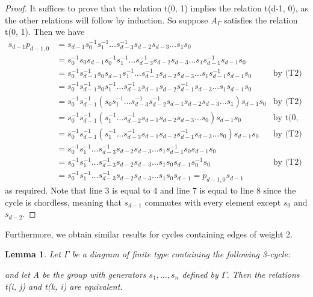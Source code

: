\documentclass[11pt]{amsart}
\newtheorem{lem}[thm]{Lemma}
\theoremstyle{definition}
\begin{document}
\begin{proof}
It suffices to prove that the relation t(0, 1) implies the relation t(d-1, 0), as the other relations will follow by induction. So suppose $A_{\Gamma}$ satisfies the relation t(0, 1). Then we have
\begin{align*}
s_{d-1}p_{d-1, 0} & = s_{d-1}s_{0}^{-1}s_{1}^{-1}\dots s_{d-3}^{-1}s_{d-2}s_{d-3}\dots s_1s_0 \\
&= s_{0}^{-1}s_{0}s_{d-1}s_{0}^{-1}s_{1}^{-1}\dots s_{d-3}^{-1}s_{d-2}s_{d-3}\dots s_{1}s_{d-1}^{-1}s_{d-1}s_{0} \\
&= s_{0}^{-1}s_{d-1}^{-1}s_{0}s_{d-1}s_{1}^{-1}\dots s_{d-3}^{-1}s_{d-2}s_{d-3}\dots s_{1}s_{d-1}^{-1}s_{d-1}s_{0} &\text{by (T2)} \\
&= s_{0}^{-1}s_{d-1}^{-1}s_{0}s_{1}^{-1}\dots s_{d-3}^{-1}s_{d-1}s_{d-2}s_{d-1}^{-1}s_{d-3}\dots s_{1}s_{d-1}s_{0} \\
&= s_{0}^{-1}s_{d-1}^{-1}(s_{0}s_{1}^{-1}\dots s_{d-3}^{-1}s_{d-2}^{-1}s_{d-1}s_{d-2}s_{d-3}\dots s_{1})s_{d-1}s_{0} &\text{by (T2)}\\
&= s_{0}^{-1}s_{d-1}^{-1}(s_{1}^{-1} \dots s_{d-2}^{-1}s_{d-1}s_{d-2}s_{d-3}\dots s_{0})s_{d-1}s_{0} &\text{by t(0, 1)}\\
&= s_{0}^{-1}s_{d-1}^{-1}(s_{1}^{-1} \dots s_{d-3}^{-1}s_{d-1}s_{d-2}s_{d-1}^{-1}s_{d-3}\dots s_{0})s_{d-1}s_{0} &\text{by (T2)}\\
&= s_{0}^{-1}s_{1}^{-1}\dots s_{d-3}^{-1}s_{d-2}s_{d-3}\dots s_{1}s_{d-1}^{-1}s_{0}s_{d-1}s_{0} \\
&= s_{0}^{-1}s_{1}^{-1}\dots s_{d-3}^{-1}s_{d-2}s_{d-3}\dots s_{1}s_{0}s_{d-1}s_{0}^{-1}s_{0} &\text{by (T2)}\\
&= s_{0}^{-1}s_{1}^{-1}\dots s_{d-3}^{-1}s_{d-2}s_{d-3}\dots s_{1}s_{0}s_{d-1} = p_{d-1, 0}s_{d-1}
\end{align*}
as required. Note that line 3 is equal to 4 and line 7 is equal to line 8 since the cycle is chordless, meaning that $s_{d-1}$ commutes with every element except $s_{0}$ and $s_{d-2}$.
\end{proof}
Furthermore, we obtain similar results for cycles containing edges of weight 2.
\begin{lem} \label{2tri}
Let $\Gamma$ be a diagram of finite type containing the following 3-cycle:

and let A be the group with generators $s_{1}, \dots, s_{n}$ defined by $\Gamma$. Then the relations t(i, j) and t(k, i) are equivalent.
\end{lem}
\end{document}
